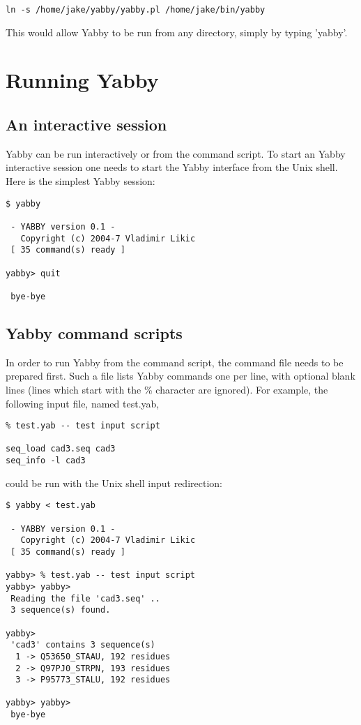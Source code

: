 \begin{verbatim}
ln -s /home/jake/yabby/yabby.pl /home/jake/bin/yabby
\end{verbatim}

This would allow Yabby to be run from any directory, simply by
typing 'yabby'.

\section{Running Yabby}

\subsection{An interactive session}

Yabby can be run interactively or from the command script. To
start an Yabby interactive session one needs to start the Yabby
interface from the Unix shell. Here is the simplest Yabby session:

\begin{verbatim}
$ yabby

 - YABBY version 0.1 - 
   Copyright (c) 2004-7 Vladimir Likic
 [ 35 command(s) ready ]

yabby> quit

 bye-bye
\end{verbatim}

\subsection{Yabby command scripts}

In order to run Yabby from the command script, the command file
needs to be prepared first. Such a file lists Yabby commands
one per line, with optional blank lines (lines which start with
the \% character are ignored). For example, the following input
file, named test.yab,

\begin{verbatim}
% test.yab -- test input script

seq_load cad3.seq cad3
seq_info -l cad3
\end{verbatim}

could be run with the Unix shell input redirection:

\begin{verbatim}
$ yabby < test.yab

 - YABBY version 0.1 - 
   Copyright (c) 2004-7 Vladimir Likic
 [ 35 command(s) ready ]

yabby> % test.yab -- test input script
yabby> yabby> 
 Reading the file 'cad3.seq' ..
 3 sequence(s) found.

yabby> 
 'cad3' contains 3 sequence(s)
  1 -> Q53650_STAAU, 192 residues
  2 -> Q97PJ0_STRPN, 193 residues
  3 -> P95773_STALU, 192 residues

yabby> yabby> 
 bye-bye
\end{verbatim}

